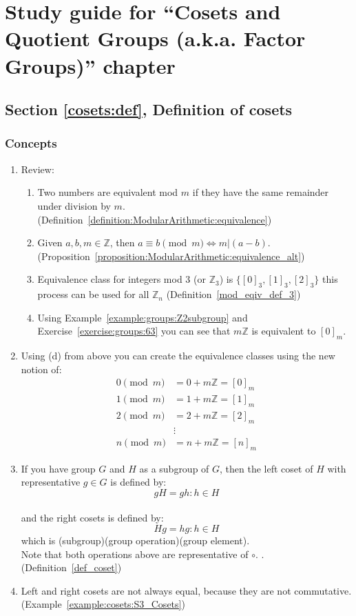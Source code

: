 \section{Study guide  for ``Cosets and Quotient Groups (a.k.a. Factor Groups)''  chapter}
\label{sec:cosets:study} 


\subsection*{Section \ref{cosets:def}, Definition of cosets}
\subsubsection*{Concepts}
\begin{enumerate}
\item 
Review:
	\begin{enumerate}
	\item
	Two numbers are equivalent mod $m$ if they have the same remainder under division by $m$. (Definition~\ref{definition:ModularArithmetic:equivalence})
	\item
	Given $a, b, m \in {\mathbb Z}$, then $a \equiv b \pmod{m} \iff m | (a - b)$. (Proposition~\ref{proposition:ModularArithmetic:equivalence_alt})
	\item
	Equivalence class for integers mod 3 (or ${\mathbb Z}_3$) is $\{ [0]_3, [1]_3, [2]_3 \}$ this process can be used for all ${\mathbb Z}_n$ (Definition~\ref{mod_eqiv_def_3})
	\item
	Using Example~\ref{example:groups:Z2subgroup} and Exercise~\ref{exercise:groups:63} you can see that $m{\mathbb Z}$ is equivalent to  $[0]_m$.
	\end{enumerate}
	
\item
Using (d) from above you can create the equivalence classes using the new notion of:
	\begin{align*}
	0 \pmod{m} &= 0 + m{\mathbb Z} = [0]_m
	\\
	1 \pmod{m} &= 1 + m{\mathbb Z} = [1]_m
	\\
	2 \pmod{m} &= 2 + m{\mathbb Z} =  [2]_m
	\\
	&\vdots
	\\
	n \pmod{m} &= n + m{\mathbb Z} =  [n]_m
	\end{align*}

\item
If you have group $G$ and $H$ as a subgroup of $G$, then the left coset of $H$ with representative $g \in G$ is defined by:
\\
$$gH = {gh:h \in H}$$
\\
and the right cosets is defined by:
\\
$$Hg = {hg:h \in H}$$
which is (subgroup)(group operation)(group element).
\\
Note that both operations above are representative of $\circ$. . (Definition~\ref{def_coset})

\item
Left and right cosets are not always equal, because they are not commutative. (Example~\ref{example:cosets:S3_Cosets})
\end{enumerate}

